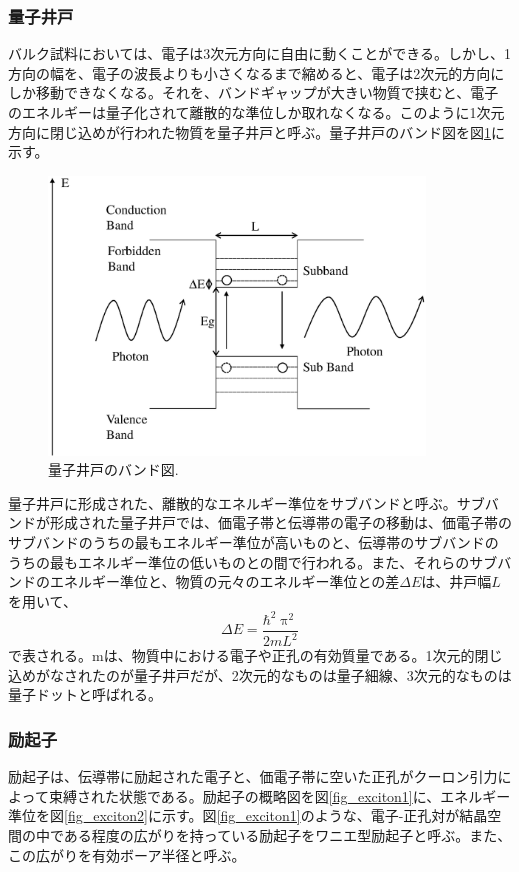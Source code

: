 \documentclass[11pt,a4j]{jsarticle}
\begin{document}
\newpage
\subsubsection{量子井戸}
バルク試料においては、電子は3次元方向に自由に動くことができる。しかし、1方向の幅を、電子の波長よりも小さくなるまで縮めると、電子は2次元的方向にしか移動できなくなる。それを、バンドギャップが大きい物質で挟むと、電子のエネルギーは量子化されて離散的な準位しか取れなくなる。このように1次元方向に閉じ込めが行われた物質を量子井戸と呼ぶ。量子井戸のバンド図を図\ref{fig_qw1}に示す。

\begin{figure}[h]
 \centering
 \includegraphics[clip,width=10cm]{start_subband.eps}
 \caption{量子井戸のバンド図.}
 \label{fig_qw1}
\end{figure}

量子井戸に形成された、離散的なエネルギー準位をサブバンドと呼ぶ。サブバンドが形成された量子井戸では、価電子帯と伝導帯の電子の移動は、価電子帯のサブバンドのうちの最もエネルギー準位が高いものと、伝導帯のサブバンドのうちの最もエネルギー準位の低いものとの間で行われる。また、それらのサブバンドのエネルギー準位と、物質の元々のエネルギー準位との差$\Delta E$は、井戸幅$L$を用いて、
\begin{equation}
 \Delta E=\frac{\mathrm{\hbar}^{2}\uppi^{2}}{2mL^{2}}
 \label{eq_qw}
\end{equation}
で表される。mは、物質中における電子や正孔の有効質量である。1次元的閉じ込めがなされたのが量子井戸だが、2次元的なものは量子細線、3次元的なものは量子ドットと呼ばれる。

\newpage
\subsubsection{励起子}
励起子は、伝導帯に励起された電子と、価電子帯に空いた正孔がクーロン引力によって束縛された状態である。励起子の概略図を図\ref{fig_exciton1}に、エネルギー準位を図\ref{fig_exciton2}に示す。図\ref{fig_exciton1}のような、電子-正孔対が結晶空間の中である程度の広がりを持っている励起子をワニエ型励起子と呼ぶ。また、この広がりを有効ボーア半径と呼ぶ。
\end{document}
